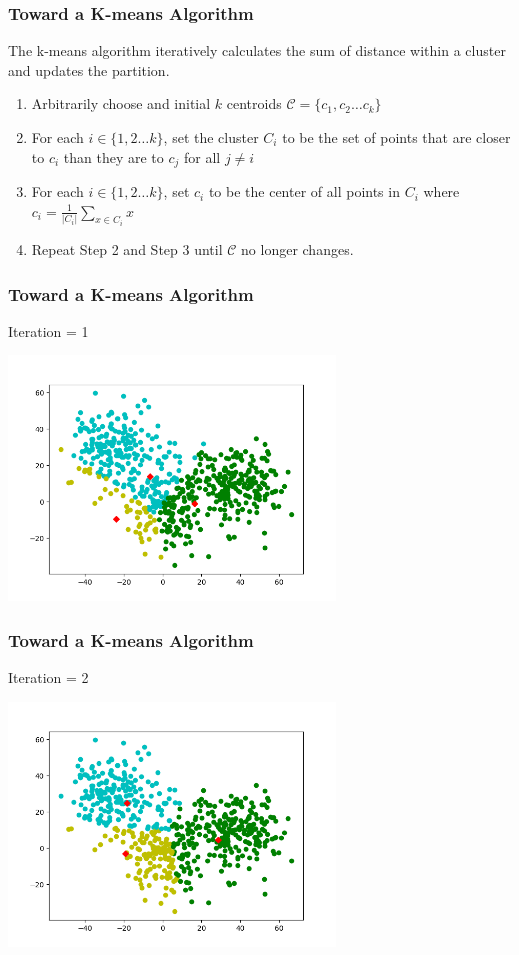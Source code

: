 \documentclass[9pt]{beamer}
\newcommand{\ccb}[1]{{\color{blue}#1}}
\newcommand{\ccp}[1]{{\color{purple}#1}}
\begin{document}
\begin{frame}
	\frametitle{Toward a K-means Algorithm}
	The k-means algorithm \ccp{iteratively} calculates the sum of distance within a cluster and updates the partition.
	\begin{enumerate}
		\item Arbitrarily choose and initial \ccb{$k$} centroids \ccb{$\mathcal{C} = \{c_1, c_2 \dots c_k\}$}
		\item For each $i \in \{1, 2 \dots k\}$, set the cluster $C_i$ to be the set of points that are \ccp{closer} to $c_i$ than they are to $c_j$ for all $j \neq i$
		\item For each $i \in \{1, 2 \dots k\}$, set $c_i$ to be the center of all points in $C_i$ where \ccb{$c_i = \frac{1}{\left\lvert C_i \right\rvert }\sum_{x \in C_i} x $}
		\item Repeat Step 2 and Step 3 until \ccb{$\mathcal{C}$} no longer changes.
	\end{enumerate}
\end{frame}

\begin{frame}
	\frametitle{Toward a K-means Algorithm}
	Iteration = 1
	\centerline{\includegraphics[width=0.65\textwidth]{figures/iteration1.png}}

\end{frame}

\begin{frame}
	\frametitle{Toward a K-means Algorithm}
	Iteration = 2
	\centerline{\includegraphics[width=0.65\textwidth]{figures/iteration2.png}}

\end{frame}
\end{document}

